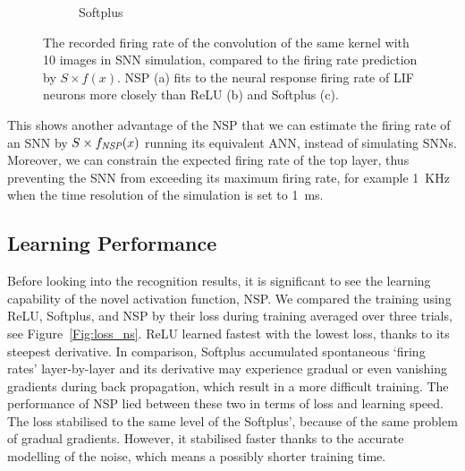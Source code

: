 \documentclass[10pt,journal,compsoc]{IEEEtran}
\begin{document}
\begin{figure}[hb!]
\begin{subfigure}[hb]{0.32\textwidth}
			\caption{Softplus}
		\end{subfigure}
		\caption{
			The recorded firing rate of the convolution of the same kernel with 10 images in SNN simulation, compared to the firing rate prediction by $S \times f(x)$.
			NSP (a) fits to the neural response firing rate of LIF neurons more closely than ReLU (b) and Softplus (c).}
		\label{fig:af_compare}
	\end{figure}		
	
	This shows another advantage of the NSP that we can estimate the firing rate of an SNN by $S \times f_{\textit{\textrm{NSP}}}(x)$ running its equivalent ANN, instead of simulating SNNs.
	Moreover, we can constrain the expected firing rate of the top layer, thus preventing the SNN from exceeding its maximum firing rate, for example 1~KHz when the time resolution of the simulation is set to 1~ms.
	
	
	\subsection{Learning Performance}
	Before looking into the recognition results, it is significant to see the learning capability of the novel activation function, NSP.
	We compared the training using ReLU, Softplus, and NSP by their loss during training averaged over three trials, see Figure~\ref{Fig:loss_ns}.
	ReLU learned fastest with the lowest loss, thanks to its steepest derivative.
	In comparison, Softplus accumulated spontaneous `firing rates' layer-by-layer and its derivative may experience gradual or even vanishing gradients during back propagation, which result in a more difficult training.
	The performance of NSP lied between these two in terms of loss and learning speed.
	The loss stabilised to the same level of the Softplus', because of the same problem of gradual gradients.
	However, it stabilised faster thanks to the accurate modelling of the noise, which means a possibly shorter training time.
	
\end{document}
